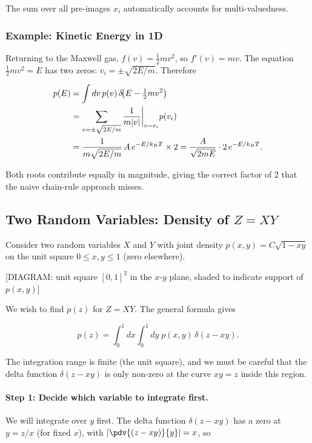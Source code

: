 The sum over all pre-images $x_i$ automatically accounts for multi-valuedness.

\subsubsection{Example: Kinetic Energy in 1D}

Returning to the Maxwell gas, $f(v)=\tfrac{1}{2}mv^2$, so $f'(v)=mv$. The equation $\tfrac{1}{2}mv^2=E$ has two zeros: $v_i = \pm\sqrt{2E/m}$. Therefore

\begin{align}
  p(E) &= \int dv\,p(v)\,\delta\!\bigl(E - \tfrac{1}{2}mv^2\bigr) \notag \\
        &= \sum_{v=\pm\sqrt{2E/m}} \frac{1}{m|v|}\bigg|_{v=v_i} p(v_i) \notag \\
        &= \frac{1}{m\sqrt{2E/m}}\,A\,e^{-E/k_BT} \times 2
         = \frac{A}{\sqrt{2mE}}\cdot 2\,e^{-E/k_BT}.
\end{align}

Both roots contribute equally in magnitude, giving the correct factor of 2 that the naive chain-rule approach misses.

\subsection{Two Random Variables: Density of \texorpdfstring{$Z=XY$}{Z=XY}}

Consider two random variables $X$ and $Y$ with joint density $p(x,y) = C\sqrt{1-xy}$ on the unit square $0\le x,y\le 1$ (zero elsewhere).

\begin{center}[DIAGRAM: unit square $[0,1]^2$ in the $x$-$y$ plane, shaded to indicate support of $p(x,y)$]\end{center}

We wish to find $p(z)$ for $Z=XY$. The general formula gives

\begin{equation}
  p(z) = \int_0^1 dx\int_0^1 dy\;p(x,y)\,\delta(z-xy).
\end{equation}

The integration range is finite (the unit square), and we must be careful that the delta function $\delta(z-xy)$ is only non-zero at the curve $xy=z$ inside this region.

\paragraph{Step 1: Decide which variable to integrate first.} We will integrate over $y$ first. The delta function $\delta(z-xy)$ has a zero at $y=z/x$ (for fixed $x$), with $\left|\pdv{(z-xy)}{y}\right|=x$, so

